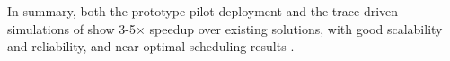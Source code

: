 In summary, both the prototype pilot deployment and the trace-driven simulations of \name show 3-5$\times$ speedup over existing solutions, with good scalability and reliability, and near-optimal scheduling results .


%
%
%





